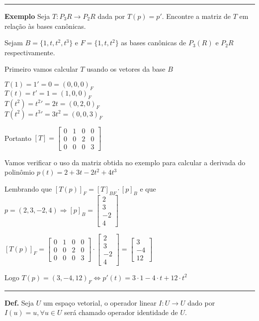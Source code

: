 \documentclass[10pt,landscape]{article}
\begin{document}
\begin{multicols}{3}
\hrule
\medskip

\textbf{Exemplo} Seja $T:P_3{R}\rightarrow P_2{R}$ dada por $T(p)=p'$. Encontre a matriz de $T$ em relação às bases canônicas.

Sejam $B=\{1,t,t^2,t^3\}$ e $F=\{1,t,t^2\}$ as bases canônicas de $P_3(R)$ e $P_2{R}$ respectivamente.

Primeiro vamos calcular $T$ usando os vetores da base $B$

$T(1)=1{'}=0=(0,0,0)_F$\\
$T(t)=t{'}=1=(1,0,0)_F$\\
$T(t^2)=t^2{'}=2t=(0,2,0)_F$\\
$T(t^2)=t^3{'}=3t^2=(0,0,3)_F$

Portanto $[T]=\begin{bmatrix}0&1&0&0\\0&0&2&0\\0&0&0&3 \end{bmatrix}$

Vamos verificar o uso da matriz obtida no exemplo para calcular a derivada do polinômio $p(t)=2+3t-2t^2+4t^3$

Lembrando que $[T(p)]_F=[T]_{BF}\cdot [p]_B$ e que $p=(2,3,-2,4)\Rightarrow [p]_B=\begin{bmatrix}2\\3\\-2\\4 \end{bmatrix}$

$[T(p)]_F=\begin{bmatrix}0&1&0&0\\0&0&2&0\\0&0&0&3 \end{bmatrix}\cdot\begin{bmatrix}2\\3\\-2\\4 \end{bmatrix}=\begin{bmatrix}3\\-4\\12\end{bmatrix}$

Logo $T(p)=(3,-4,12)_F\Leftrightarrow p'(t)=3\cdot 1-4\cdot t+12\cdot t^2$

\medskip 
\hrule
\medskip

\textbf{Def.} Seja $U$ um espaço vetorial, o operador linear $I:U\rightarrow U$ dado por $I(u)=u, \forall u\in U$ será chamado operador identidade de $U$.


\end{multicols}
\end{document}

